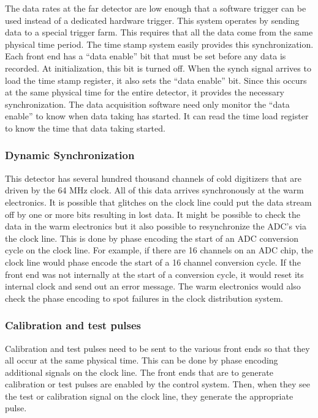 The data rates at the far detector are low enough that a software
trigger can be used instead of a dedicated hardware trigger.  This
system operates by sending data to a special trigger farm.  This
requires that all the data come from the same physical time period.
The time stamp system easily provides this synchronization.  Each
front end has a ``data enable'' bit that must be set before any data is
recorded.  At initialization, this bit is turned off.  When the synch
signal arrives to load the time stamp register, it also sets the ``data
enable'' bit.  Since this occurs at the same physical time for the
entire detector, it provides the necessary synchronization.  The data
acquisition software need only monitor the ``data enable'' to know when
data taking has started.  It can read the time load register to know
the time that data taking started.

\subsubsection{Dynamic Synchronization}

This detector has several hundred thousand channels of cold digitizers
that are driven by the 64 MHz clock.  All of this data arrives
synchronously at the warm electronics.  It is possible that glitches
on the clock line could put the data stream off by one or more bits
resulting in lost data.  It might be possible to check the data in the
warm electronics but it also possible to resynchronize the ADC’s via
the clock line.  This is done by phase encoding the start of an ADC
conversion cycle on the clock line.  For example, if there are 16
channels on an ADC chip, the clock line would phase encode the start
of a 16 channel conversion cycle.  If the front end was not internally
at the start of a conversion cycle, it would reset its internal clock
and send out an error message.  The warm electronics would also check
the phase encoding to spot failures in the clock distribution system.

\subsubsection{Calibration and test pulses}

Calibration and test pulses need to be sent to the various front ends
so that they all occur at the same physical time.  This can be done by
phase encoding additional signals on the clock line.  The front ends
that are to generate calibration or test pulses are enabled by the
control system.  Then, when they see the test or calibration signal on
the clock line, they generate the appropriate pulse.


